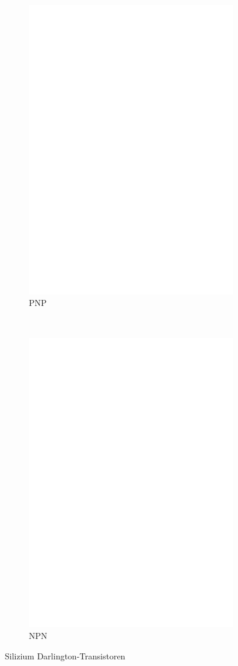 \begin{figure}[H]
  \begin{subfigure}[b]{9cm}
    \centering
    \includegraphics[width=9cm]{../FIG/BJT_BC516.eps}
    \caption{PNP}
    \label{fig:BJT-PNP-Darl}
  \end{subfigure}
  ~
  \begin{subfigure}[b]{9cm}
    \centering
    \includegraphics[width=9cm]{../FIG/BJT_BC517.eps}
    \caption{NPN}
    \label{fig:BJT-NPN-Darl}
  \end{subfigure}
  \caption{Silizium Darlington-Transistoren}
\end{figure}

